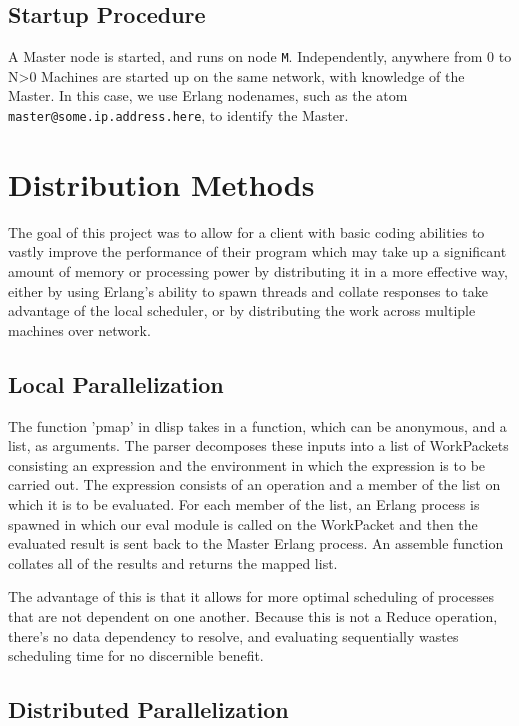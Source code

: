 \documentclass[letterpaper,twocolumn,10pt]{article}
\begin{document}
\subsection{Startup Procedure}

A Master node is started, and runs on node \verb|M|. Independently, anywhere
from 0 to N>0 Machines are started up on the same network, with knowledge of
the Master. In this case, we use Erlang nodenames, such as the atom
\verb|master@some.ip.address.here|, to identify the Master.

\section{Distribution Methods}

The goal of this project was to allow for a client with basic coding abilities
to vastly improve the performance of their program which may take up a
significant amount of memory or processing power by distributing it in a more
effective way, either  by using Erlang's ability to spawn threads and collate
responses to take advantage of the local scheduler, or by distributing the work
across multiple machines over network.

\subsection{Local Parallelization}

The function 'pmap' in dlisp takes in a function, which can be anonymous, and a
list, as arguments. The parser decomposes these inputs into a list of
WorkPackets consisting an expression and the environment in which the
expression is to be carried out.  The expression consists of an operation and a
member of the list on which it is to be evaluated. For each member of the list,
an Erlang process is spawned in which our eval module is called on the
WorkPacket and then the evaluated result is sent back to the Master Erlang
process. An assemble function collates all of the results and returns the
mapped list.

The advantage of this is that it allows for more optimal scheduling of
processes that are not dependent on one another. Because this is not a Reduce
operation, there's no data dependency to resolve, and evaluating sequentially
wastes scheduling time for no discernible benefit.

\subsection{Distributed Parallelization}
\end{document}
